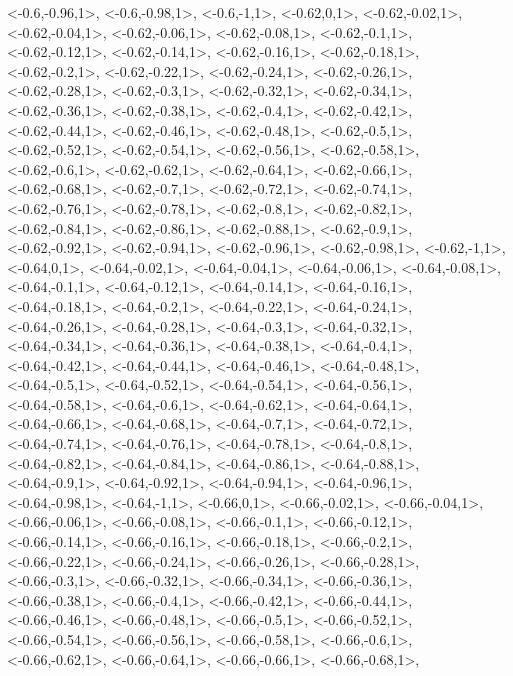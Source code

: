 \documentclass[a4paper,10pt]{article}
\begin{document}
\begin{eulernotebook}
\begin{euleroutput}
  <-0.6,-0.96,1>,
  <-0.6,-0.98,1>,
  <-0.6,-1,1>,
  <-0.62,0,1>,
  <-0.62,-0.02,1>,
  <-0.62,-0.04,1>,
  <-0.62,-0.06,1>,
  <-0.62,-0.08,1>,
  <-0.62,-0.1,1>,
  <-0.62,-0.12,1>,
  <-0.62,-0.14,1>,
  <-0.62,-0.16,1>,
  <-0.62,-0.18,1>,
  <-0.62,-0.2,1>,
  <-0.62,-0.22,1>,
  <-0.62,-0.24,1>,
  <-0.62,-0.26,1>,
  <-0.62,-0.28,1>,
  <-0.62,-0.3,1>,
  <-0.62,-0.32,1>,
  <-0.62,-0.34,1>,
  <-0.62,-0.36,1>,
  <-0.62,-0.38,1>,
  <-0.62,-0.4,1>,
  <-0.62,-0.42,1>,
  <-0.62,-0.44,1>,
  <-0.62,-0.46,1>,
  <-0.62,-0.48,1>,
  <-0.62,-0.5,1>,
  <-0.62,-0.52,1>,
  <-0.62,-0.54,1>,
  <-0.62,-0.56,1>,
  <-0.62,-0.58,1>,
  <-0.62,-0.6,1>,
  <-0.62,-0.62,1>,
  <-0.62,-0.64,1>,
  <-0.62,-0.66,1>,
  <-0.62,-0.68,1>,
  <-0.62,-0.7,1>,
  <-0.62,-0.72,1>,
  <-0.62,-0.74,1>,
  <-0.62,-0.76,1>,
  <-0.62,-0.78,1>,
  <-0.62,-0.8,1>,
  <-0.62,-0.82,1>,
  <-0.62,-0.84,1>,
  <-0.62,-0.86,1>,
  <-0.62,-0.88,1>,
  <-0.62,-0.9,1>,
  <-0.62,-0.92,1>,
  <-0.62,-0.94,1>,
  <-0.62,-0.96,1>,
  <-0.62,-0.98,1>,
  <-0.62,-1,1>,
  <-0.64,0,1>,
  <-0.64,-0.02,1>,
  <-0.64,-0.04,1>,
  <-0.64,-0.06,1>,
  <-0.64,-0.08,1>,
  <-0.64,-0.1,1>,
  <-0.64,-0.12,1>,
  <-0.64,-0.14,1>,
  <-0.64,-0.16,1>,
  <-0.64,-0.18,1>,
  <-0.64,-0.2,1>,
  <-0.64,-0.22,1>,
  <-0.64,-0.24,1>,
  <-0.64,-0.26,1>,
  <-0.64,-0.28,1>,
  <-0.64,-0.3,1>,
  <-0.64,-0.32,1>,
  <-0.64,-0.34,1>,
  <-0.64,-0.36,1>,
  <-0.64,-0.38,1>,
  <-0.64,-0.4,1>,
  <-0.64,-0.42,1>,
  <-0.64,-0.44,1>,
  <-0.64,-0.46,1>,
  <-0.64,-0.48,1>,
  <-0.64,-0.5,1>,
  <-0.64,-0.52,1>,
  <-0.64,-0.54,1>,
  <-0.64,-0.56,1>,
  <-0.64,-0.58,1>,
  <-0.64,-0.6,1>,
  <-0.64,-0.62,1>,
  <-0.64,-0.64,1>,
  <-0.64,-0.66,1>,
  <-0.64,-0.68,1>,
  <-0.64,-0.7,1>,
  <-0.64,-0.72,1>,
  <-0.64,-0.74,1>,
  <-0.64,-0.76,1>,
  <-0.64,-0.78,1>,
  <-0.64,-0.8,1>,
  <-0.64,-0.82,1>,
  <-0.64,-0.84,1>,
  <-0.64,-0.86,1>,
  <-0.64,-0.88,1>,
  <-0.64,-0.9,1>,
  <-0.64,-0.92,1>,
  <-0.64,-0.94,1>,
  <-0.64,-0.96,1>,
  <-0.64,-0.98,1>,
  <-0.64,-1,1>,
  <-0.66,0,1>,
  <-0.66,-0.02,1>,
  <-0.66,-0.04,1>,
  <-0.66,-0.06,1>,
  <-0.66,-0.08,1>,
  <-0.66,-0.1,1>,
  <-0.66,-0.12,1>,
  <-0.66,-0.14,1>,
  <-0.66,-0.16,1>,
  <-0.66,-0.18,1>,
  <-0.66,-0.2,1>,
  <-0.66,-0.22,1>,
  <-0.66,-0.24,1>,
  <-0.66,-0.26,1>,
  <-0.66,-0.28,1>,
  <-0.66,-0.3,1>,
  <-0.66,-0.32,1>,
  <-0.66,-0.34,1>,
  <-0.66,-0.36,1>,
  <-0.66,-0.38,1>,
  <-0.66,-0.4,1>,
  <-0.66,-0.42,1>,
  <-0.66,-0.44,1>,
  <-0.66,-0.46,1>,
  <-0.66,-0.48,1>,
  <-0.66,-0.5,1>,
  <-0.66,-0.52,1>,
  <-0.66,-0.54,1>,
  <-0.66,-0.56,1>,
  <-0.66,-0.58,1>,
  <-0.66,-0.6,1>,
  <-0.66,-0.62,1>,
  <-0.66,-0.64,1>,
  <-0.66,-0.66,1>,
  <-0.66,-0.68,1>,

\end{euleroutput}
\end{eulernotebook}
\end{document}
